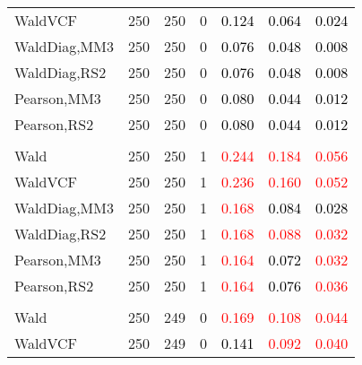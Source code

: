\documentclass[
]{article}
\begin{document}
\begin{table}[H]
{\begin{tabular}[t]{lrrrrrr}
\hspace{1em}WaldVCF & 250 & 250 & 0 & \textcolor{black}{0.124} & \textcolor{black}{0.064} & \textcolor{black}{0.024}\\
\hspace{1em}WaldDiag,MM3 & 250 & 250 & 0 & \textcolor{black}{0.076} & \textcolor{black}{0.048} & \textcolor{black}{0.008}\\
\hspace{1em}WaldDiag,RS2 & 250 & 250 & 0 & \textcolor{black}{0.076} & \textcolor{black}{0.048} & \textcolor{black}{0.008}\\
\hspace{1em}Pearson,MM3 & 250 & 250 & 0 & \textcolor{black}{0.080} & \textcolor{black}{0.044} & \textcolor{black}{0.012}\\
\hspace{1em}Pearson,RS2 & 250 & 250 & 0 & \textcolor{black}{0.080} & \textcolor{black}{0.044} & \textcolor{black}{0.012}\\
\addlinespace[0.3em]
\multicolumn{7}{l}{\textbf{1F 15V}}\\
\hspace{1em}Wald & 250 & 250 & 1 & \textcolor{red}{0.244} & \textcolor{red}{0.184} & \textcolor{red}{0.056}\\
\hspace{1em}WaldVCF & 250 & 250 & 1 & \textcolor{red}{0.236} & \textcolor{red}{0.160} & \textcolor{red}{0.052}\\
\hspace{1em}WaldDiag,MM3 & 250 & 250 & 1 & \textcolor{red}{0.168} & \textcolor{black}{0.084} & \textcolor{black}{0.028}\\
\hspace{1em}WaldDiag,RS2 & 250 & 250 & 1 & \textcolor{red}{0.168} & \textcolor{red}{0.088} & \textcolor{red}{0.032}\\
\hspace{1em}Pearson,MM3 & 250 & 250 & 1 & \textcolor{red}{0.164} & \textcolor{black}{0.072} & \textcolor{red}{0.032}\\
\hspace{1em}Pearson,RS2 & 250 & 250 & 1 & \textcolor{red}{0.164} & \textcolor{black}{0.076} & \textcolor{red}{0.036}\\
\addlinespace[0.3em]
\multicolumn{7}{l}{\textbf{2F 10V}}\\
\hspace{1em}Wald & 250 & 249 & 0 & \textcolor{red}{0.169} & \textcolor{red}{0.108} & \textcolor{red}{0.044}\\
\hspace{1em}WaldVCF & 250 & 249 & 0 & \textcolor{black}{0.141} & \textcolor{red}{0.092} & \textcolor{red}{0.040}\\

\end{tabular}}
\end{table}
\end{document}
